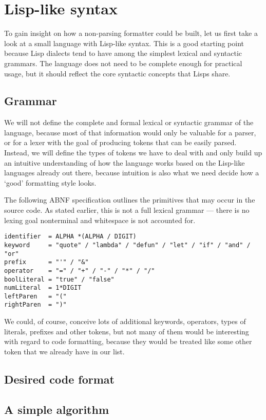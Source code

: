 \chapter{Lisp-like syntax}
To gain insight on how a non-parsing formatter could be built,
let us first take a look at a small language with Lisp-like syntax.
This is a good starting point because Lisp dialects tend to
have among the simplest lexical and syntactic grammars.
The language does not need to be complete enough for practical usage,
but it should reflect the core syntactic concepts that Lisps share.

\section{Grammar}
We will not define the complete and formal lexical or syntactic grammar of the language,
because most of that information would only be valuable for a parser,
or for a lexer with the goal of producing tokens that can be easily parsed.
Instead, we will define the types of tokens we have to deal with
and only build up an intuitive understanding of how the language works
based on the Lisp-like languages already out there,
because intuition is also what we need decide how a `good' formatting style looks.

The following ABNF specification outlines the primitives that may occur in the source code.
As stated earlier, this is not a full lexical grammar ---
there is no lexing goal nonterminal and whitespace is not accounted for.

\begin{verbatim}
identifier  = ALPHA *(ALPHA / DIGIT)
keyword     = "quote" / "lambda" / "defun" / "let" / "if" / "and" / "or"
prefix      = "'" / "&"
operator    = "=" / "+" / "-" / "*" / "/"
boolLiteral = "true" / "false"
numLiteral  = 1*DIGIT
leftParen   = "("
rightParen  = ")"
\end{verbatim}

We could, of course, conceive lots of additional keywords, operators,
types of literals, prefixes and other tokens,
but not many of them would be interesting with regard to code formatting,
because they would be treated like some other token that we already have in our list.

\section{Desired code format}
\section{A simple algorithm}
